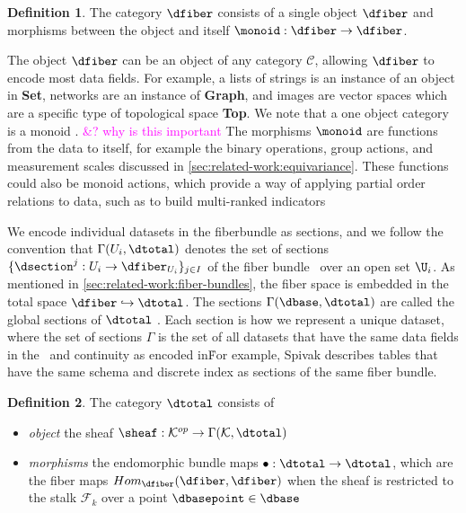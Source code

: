 \documentclass[10pt,journal,compsoc]{IEEEtran}
\newcommand{\note}[1]{\textcolor{magenta}{#1}}
\theoremstyle{definition}
\newtheorem{definition}{Definition}[section]
\theoremstyle{remark}
\begin{document}
\begin{definition} 
  \label{def:category:F} 
  The category $\mathcal{\dfiber}$ consists of a single object $\dfiber$ and morphisms between the object and itself $\monoid: \dfiber \rightarrow \dfiber$. 
\end{definition}

The object $\texttt{\dfiber}$ can be an object of any category $\mathcal{C}$, allowing $\texttt{\dfiber}$ to encode most data fields. For example, a lists of strings is an instance of an object in \textbf{Set}, networks are an instance of \textbf{Graph}, and images are vector spaces which are a specific type of topological space \textbf{Top}. We note that a one object category is a monoid \cite{nlab:monoid,barrCategoryTheoryComputing}. \note{&? why is this important} The morphisms $\monoid$ are functions from the data to itself, for example the binary operations, group actions, and measurement scales discussed in \autoref{sec:related-work:equivariance}. These functions could also be monoid actions\cite{barrCategoryTheoryComputing}, which provide a way of applying partial order relations to data\cite{fongInvitationAppliedCategory2019}, such as to build multi-ranked indicators\cite{bruggemannRankingPrioritizationMultiindicator2011}

We encode individual datasets in the fiberbundle as sections, and we follow the convention that $\Gamma(U_i, \dtotal)$ denotes the set of sections $\{\dsection^{j}:U_i \rightarrow \dfiber_{U_{i}}\}_{j\in I}$ of the fiber bundle \dtotal\ over an open set $\U_{i}$.  As mentioned in \autoref{sec:related-work:fiber-bundles}, the fiber space is embedded in the total space $\dfiber \hookrightarrow \dtotal$. The sections $\Gamma(\dbase, \dtotal)$ are called the global sections of $\dtotal$ \cite{SheafMathematics2021,spanier1989algebraic}. Each section is how we represent a unique dataset, where the set of sections $\Gamma$ is the set of all datasets that have the same data fields in the \dfiber\ and continuity as encoded in\dbase\. For example, Spivak describes tables that have the same schema and discrete index as sections of the same fiber bundle\cite{spivakSIMPLICIALDATABASES}.

\begin{definition} The category $\mathcal{\dtotal}$ consists of 
  \begin{itemize}
    \item\textit{object} the sheaf\cite{SheafMathematics2021,ghristElementaryAppliedTopology2014} $\sheaf: \mathcal{K}^{op} \rightarrow \Gamma(\mathcal{K}, \dtotal)$
    \item \textit{morphisms} the endomorphic\cite{fongInvitationAppliedCategory2019} bundle maps $\bullet: \dtotal\rightarrow \dtotal$, which are the fiber maps $Hom_{\mathcal{\dfiber}}(\dfiber,\dfiber)$ when the sheaf is restricted to the stalk\cite{StalkSheaf2019} $\mathscr{F}_{k}$ over a point $\dbasepoint\in \dbase$
  \end{itemize}
\end{definition}
\end{document}
